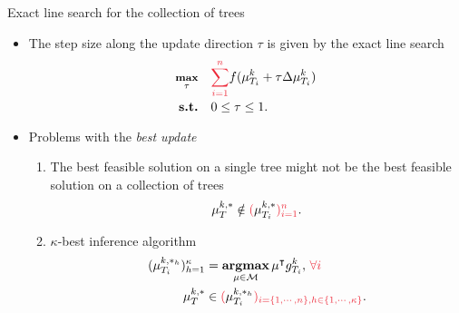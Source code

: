 \documentclass[first=dgreen,second=purple,logo=yellowexc]{aaltoslides}
\begin{document}
\begin{frame}{Exact line search for the collection of trees}
	\begin{itemize}
		\item The step size along the update direction $\tau$ is given by the exact line search
		\begin{align*}\footnotesize
			\underset{\tau}{\maximize} &\quad {\color{aaltored}\sum_{i=1}^n}f(\vmu_{T_i}^k + \tau\Delta\vmu_{T_i}^{k})\\
			\st &\quad 0\le\tau\le1.
		\end{align*}
		\item Problems with the {\em best update}
		\begin{enumerate}\footnotesize
			\item The best feasible solution on a single tree might not be the best feasible solution on a collection of trees
			\begin{align*}
				{\vmu}_{T}^{k,*}\notin{\color{aaltored}(}{\vmu}_{T_i}^{k,*}{\color{aaltored})_{i=1}^n}.
			\end{align*}
			\item $\kappa$-best inference algorithm
			\begin{align*}
				({\vmu}_{T_i}^{k,*_h})_{h=1}^{\kappa} &= \underset{\vmu\in\Mcal}{\argmax}\,\vmu\tp g_{T_i}^k,\,{\color{aaltored}\forall i}\\
				{\vmu}_{T}^{k,*} &\in {\color{aaltored}(}{\vmu}_{T_i}^{k,*_h}{\color{aaltored})_{i=\{1,\cdots,n\},h\in\{1,\cdots,\kappa\}}}.
			\end{align*}
		\end{enumerate}
	\end{itemize}
\end{frame}
\end{document}
